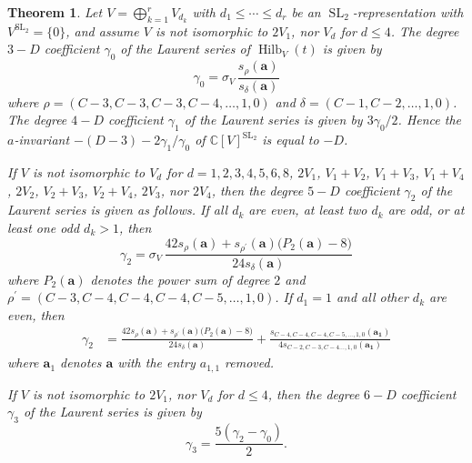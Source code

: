 \documentclass{amsart}
\newtheorem{theorem}{Theorem}[section]
\theoremstyle{definition}
\theoremstyle{remark}
\newcommand{\C}{\mathbb{C}}
\newcommand{\SL}{\operatorname{SL}}
\newcommand{\bs}{\boldsymbol}
\newcommand{\Hilb}{\operatorname{Hilb}}
\begin{document}
\begin{theorem}
\label{thrm:Main}
Let $V = \bigoplus_{k=1}^r V_{d_k}$ with $d_1 \le \cdots \le d_r$ be an $\SL_2$-representation with $V^{\SL_2} = \{0\}$,
and assume $V$ is not isomorphic to $2V_1$, nor $V_d$ for $d \leq 4$.
The degree $3-D$ coefficient $\gamma_0$ of the Laurent series of $\Hilb_V(t)$ is given by
\begin{equation}
\label{eq:Gamma0}
    \gamma_0
    = \sigma_V\,
    \frac{ s_{\rho}(\bs{a}) }
        {s_{\delta}(\bs{a})}
\end{equation}
where $\rho = (C-3,C-3,C-3,C-4,\ldots,1,0)$ and $\delta = (C-1,C-2,\ldots,1,0)$.
The degree $4-D$ coefficient $\gamma_1$ of the Laurent series is given by $3\gamma_0/2$.
Hence the $a$-invariant $-(D-3) - 2\gamma_1/\gamma_0$ of $\C[V]^{\SL_2}$ is equal to $-D$.

If $V$ is not isomorphic to $V_d$ for $d=1,2,3,4,5,6,8$, $2V_1$, $V_1+V_2$, $V_1+V_3$, $V_1+V_4$,
$2V_2$, $V_2+V_3$, $V_2+V_4$, $2V_3$, nor $2V_4$, then the degree $5-D$ coefficient $\gamma_2$
of the Laurent series is given as follows. If all $d_k$ are even, at least two $d_k$ are odd, or at least one odd $d_k > 1$, then
\begin{equation}
\label{eq:Gamma2Case1}
    \gamma_2
    =
    \sigma_V\,
    \frac{42 s_{\rho}(\bs{a}) + s_{\rho^\prime}(\bs{a})
            \big( P_2(\bs{a})  - 8\big) }
                {24 s_\delta(\bs{a})}
\end{equation}
where $P_2(\bs{a})$ denotes the power sum of degree $2$ and $\rho^\prime = (C-3, C-4, C-4, C-4, C-5,\ldots,1,0)$.
If $d_1 = 1$ and all other $d_k$ are even, then
\begin{align}
\label{eq:Gamma2Case2}
    \gamma_2
    &=
    \frac{42 s_{\rho}(\bs{a}) + s_{\rho^\prime}(\bs{a})
            \big( P_2(\bs{a})  - 8\big) }
                {24 s_\delta(\bs{a})}
        + \frac{s_{C - 4, C - 4, C - 4, C - 5, \ldots, 1, 0}(\bs{a_1}) }
            {4 s_{C - 2, C - 3, C - 4 \ldots, 1, 0}(\bs{a_1}) }
\end{align}
where $\bs{a}_1$ denotes $\bs{a}$ with the entry $a_{1,1}$ removed.

If $V$ is not isomorphic to $2V_1$, nor $V_d$ for $d \leq 4$, then
the degree $6-D$ coefficient $\gamma_3$ of the Laurent series is given by
\begin{equation}
\label{eq:Gamma3}
    \gamma_3 = \frac{5(\gamma_2 - \gamma_0)}{2}.
\end{equation}
\end{theorem}
\end{document}
